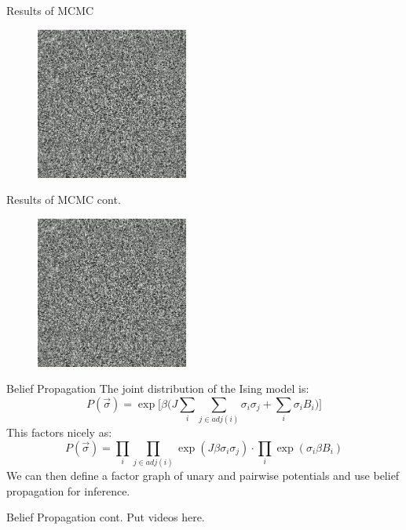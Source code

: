 \documentclass{minesbeamer}
\begin{document}
\begin{frame}{Results of MCMC}
    \centering
    \begin{figure}
    \includegraphics[width = 10 cm, height = 5cm]{mcmc.png}
    \end{figure}
\end{frame}

\begin{frame}{Results of MCMC cont.}
    \centering
    \begin{figure}
    \href{https://drive.google.com/file/d/1HwG_GxrhNblpf6vEiYciI8tJVZLoPw_y/view?usp=drive_link}{\includegraphics[width = 5 cm, height = 5cm]{mcmc.png}}
    \end{figure}
\end{frame}

\begin{frame}{Belief Propagation}
    \centering
    The joint distribution of the Ising model is:
    \[
    P(\vec{\sigma}) = \exp \Bigr [ \beta \Bigr ( J\sum_i \sum_{j \in adj(i)} \sigma_i \sigma_j + \sum_i \sigma_i B_i \Bigr ) \Bigr ]
    \]
    This factors nicely as:
    \[
    P(\vec{\sigma}) = \prod_i \prod_{j \in adj(i)} \exp (J \beta \sigma_i \sigma_j) \cdot \prod_i \exp(\sigma_i \beta B_i)
    \]
    We can then define a factor graph of unary and pairwise potentials and use 
    belief propagation for inference. 
\end{frame}

\begin{frame}{Belief Propagation cont. }
    Put videos here. 
\end{frame}
\end{document}
